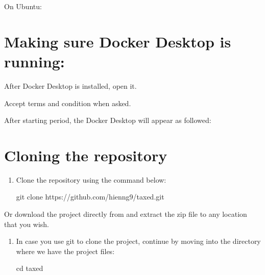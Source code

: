 \documentclass[letterpaper,10pt,english]{sphinxmanual}
\begin{document}
\sphinxAtStartPar
On Ubuntu: 


\section{Making sure Docker Desktop is running:}
\label{\detokenize{pages/installation-testing:making-sure-docker-desktop-is-running}}
\sphinxAtStartPar
After Docker Desktop is installed, open it.

\sphinxAtStartPar
Accept terms and condition when asked.

\noindent{}

\sphinxAtStartPar
After starting period, the Docker Desktop will appear as followed:

\noindent{}


\section{Cloning the repository}
\label{\detokenize{pages/installation-testing:cloning-the-repository}}\begin{enumerate}
%
\item {} 
\sphinxAtStartPar
Clone the repository using the command below:

\begin{sphinxVerbatim}[commandchars=\\\{\}]
\PYGZdl{} git clone https://github.com/hienng9/taxed.git
\end{sphinxVerbatim}

\end{enumerate}

\sphinxAtStartPar
Or download the project directly from  and extract the zip file to any location that you wish.

\noindent{}
\begin{enumerate}
%
\setcounter{enumi}{1}
\item {} 
\sphinxAtStartPar
In case you use git to clone the project, continue by moving into the directory where we have the project files:

\begin{sphinxVerbatim}[commandchars=\\\{\}]
\PYGZdl{} cd taxed
\end{sphinxVerbatim}

\end{enumerate}
\end{document}
